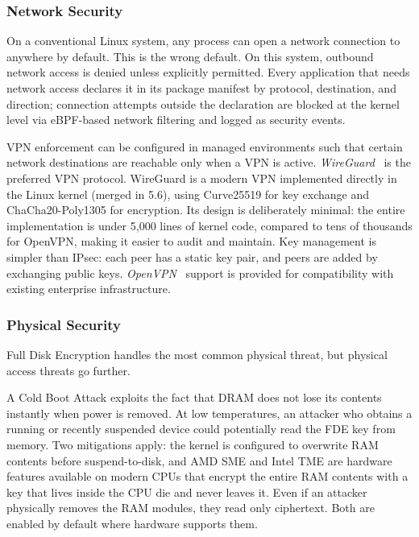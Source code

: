 \subsubsection{Network Security}
\label{sec:network-security}

On a conventional Linux system, any process can open a network connection to
anywhere by default. This is the wrong default. On this system, outbound
network access is denied unless explicitly permitted. Every application that
needs network access declares it in its package manifest by protocol,
destination, and direction; connection attempts outside the declaration are
blocked at the kernel level via eBPF-based network filtering and logged as
security events.

VPN enforcement can be configured in managed environments such that certain
network destinations are reachable only when a VPN is active. \emph{WireGuard}~\cite{wireguard} is the preferred VPN protocol. WireGuard is
a modern VPN implemented directly in the Linux kernel (merged in 5.6), using
Curve25519 for key exchange and ChaCha20-Poly1305 for encryption. Its design
is deliberately minimal: the entire implementation is under 5,000 lines of
kernel code, compared to tens of thousands for OpenVPN, making it easier to
audit and maintain. Key management is simpler than IPsec: each peer has a
static key pair, and peers are added by exchanging public keys.
\emph{OpenVPN}~\cite{openvpn} support is provided for compatibility with
existing enterprise infrastructure.

\subsubsection{Physical Security}
\label{sec:physical}

Full Disk Encryption handles the most common physical threat, but physical
access threats go further.

A Cold Boot Attack exploits the fact that DRAM does not lose its contents
instantly when power is removed. At low temperatures, an attacker who obtains
a running or recently suspended device could potentially read the FDE key from
memory. Two mitigations apply: the kernel is configured to overwrite RAM
contents before suspend-to-disk, and AMD SME and Intel TME are hardware
features available on modern CPUs that encrypt the entire RAM contents with a
key that lives inside the CPU die and never leaves it. Even if an attacker
physically removes the RAM modules, they read only ciphertext. Both are
enabled by default where hardware supports them.

